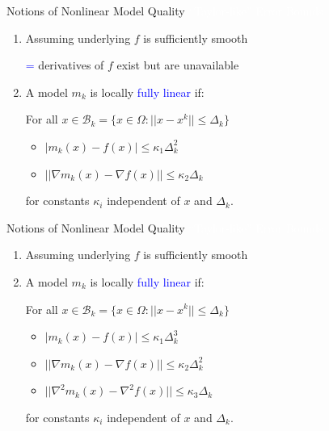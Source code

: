 \documentclass[handout,aspectratio=54]{beamer}
\numberwithin{theorem}{section}
\begin{document}
\begin{frame}{Notions of Nonlinear Model Quality}
\colorbox[rgb]{0.5,0.6,0.7}{\textcolor{white}{“Taylor-like” Error Bounds}}
\begin{enumerate}
\item Assuming underlying $f$ is sufficiently smooth

\textcolor{blue}{=} derivatives of $f$ exist but are unavailable

\item A model $m_k$ is locally \textcolor{blue}{fully linear} if:

For all $x\in\mathcal{B}_k=\{x\in\Omega:||x-x^k||\le\Delta_k\}$
	\begin{itemize}
	\item $|m_k(x)-f(x)|\le\kappa_1\Delta^2_k$
	\item $||\nabla m_k(x)-\nabla f(x)||\le\kappa_2\Delta_k$
	\end{itemize}
for constants $\kappa_i$ independent of $x$ and $\Delta_k$.
\end{enumerate}

\scriptsize{}
\end{frame}

\begin{frame}{Notions of Nonlinear Model Quality}
\colorbox[rgb]{0.5,0.6,0.7}{\textcolor{white}{“Taylor-like” Error Bounds}}
\begin{enumerate}
\item Assuming underlying $f$ is sufficiently smooth

\item A model $m_k$ is locally \textcolor{blue}{fully linear} if:

For all $x\in\mathcal{B}_k=\{x\in\Omega:||x-x^k||\le\Delta_k\}$
	\begin{itemize}
	\item $|m_k(x)-f(x)|\le\kappa_1\Delta^3_k$
	\item $||\nabla m_k(x)-\nabla f(x)||\le\kappa_2\Delta^2_k$
	\item $||\nabla^2 m_k(x)-\nabla^2 f(x)||\le\kappa_3\Delta_k$
	\end{itemize}
for constants $\kappa_i$ independent of $x$ and $\Delta_k$.
\end{enumerate}

\scriptsize{}
\end{frame}
\end{document}
